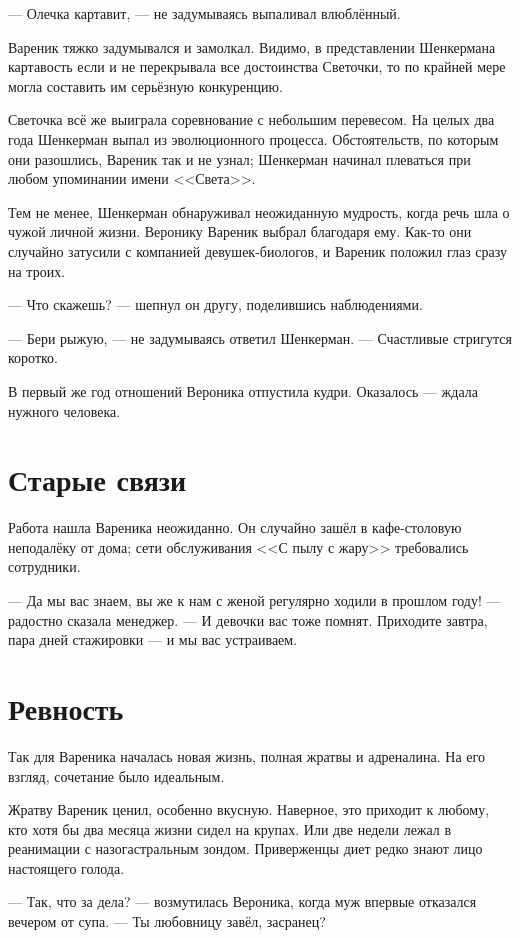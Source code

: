 \documentclass[a4paper,10pt,fleqn]{book}\usepackage{polyglossia}\setdefaultlanguage{english}\setotherlanguage{russian}\defaultfontfeatures{Ligatures=TeX,Mapping=tex-text} \usepackage{xcolor}\definecolor{lightgray}{HTML}{bbbbbb}\color{lightgray}\newcommand{\ml}[3]{\textcolor{black}{#3}}
\begin{document}
--- Олечка картавит, --- не задумываясь выпаливал влюблённый.

Вареник тяжко задумывался и замолкал.
Видимо, в представлении Шенкермана картавость если и не перекрывала все достоинства Светочки, то по крайней мере могла составить им серьёзную конкуренцию.

Светочка всё же выиграла соревнование с небольшим перевесом.
На целых два года Шенкерман выпал из эволюционного процесса.
Обстоятельств, по которым они разошлись, Вареник так и не узнал;
Шенкерман начинал плеваться при любом упоминании имени <<Света>>.

Тем не менее, Шенкерман обнаруживал неожиданную мудрость, когда речь шла о чужой личной жизни.
Веронику Вареник выбрал благодаря ему.
Как-то они случайно затусили с компанией девушек-биологов, и Вареник положил глаз сразу на троих.

--- Что скажешь? --- шепнул он другу, поделившись наблюдениями.

--- Бери рыжую, --- не задумываясь ответил Шенкерман.
--- Счастливые стригутся коротко.

В первый же год отношений Вероника отпустила кудри.
Оказалось --- ждала нужного человека.

\section{Старые связи}

Работа нашла Вареника неожиданно.
Он случайно зашёл в кафе-столовую неподалёку от дома;
сети обслуживания <<С пылу с жару>> требовались сотрудники.

--- Да мы вас знаем, вы же к нам с женой регулярно ходили в прошлом году! --- радостно сказала менеджер.
--- И девочки вас тоже помнят.
Приходите завтра, пара дней стажировки --- и мы вас устраиваем.

\section{Ревность}

Так для Вареника началась новая жизнь, полная жратвы и адреналина.
На его взгляд, сочетание было идеальным.

Жратву Вареник ценил, особенно вкусную.
Наверное, это приходит к любому, кто хотя бы два месяца жизни сидел на крупах.
Или две недели лежал в реанимации с назогастральным зондом.
Приверженцы диет редко знают лицо настоящего голода.

--- Так, что за дела? --- возмутилась Вероника, когда муж впервые отказался вечером от супа.
--- Ты любовницу завёл, засранец?
\end{document}
